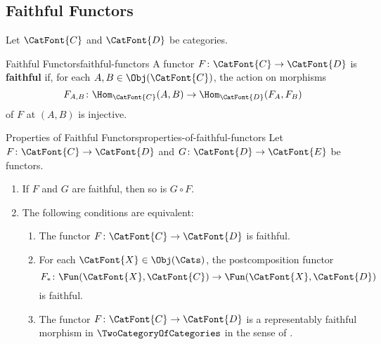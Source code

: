 \subsection{Faithful Functors}\label{subsection-faithful-functors}
Let $\CatFont{C}$ and $\CatFont{D}$ be categories.
\begin{definition}{Faithful Functors}{faithful-functors}%
    A functor $F\colon\CatFont{C}\to\CatFont{D}$ is \textbf{faithful} if, for each $A,B\in\Obj(\CatFont{C})$, the action on morphisms
    \[
        F_{A,B}
        \colon
        \Hom_{\CatFont{C}}(A,B)
        \to
        \Hom_{\CatFont{D}}(F_{A},F_{B})
    \]%
    of $F$ at $(A,B)$ is injective.
\end{definition}
\begin{proposition}{Properties of Faithful Functors}{properties-of-faithful-functors}%
    Let $F\colon\CatFont{C}\to\CatFont{D}$ and $G\colon\CatFont{D}\to\CatFont{E}$ be functors.
    \begin{enumerate}
        \item\label{properties-of-faithful-functors-interaction-with-composition}If $F$ and $G$ are faithful, then so is $G\circ F$.
        \item\label{properties-of-faithful-functors-interaction-with-postcomposition}The following conditions are equivalent:
            \begin{enumerate}
                \item\label{properties-of-faithful-functors-interaction-with-postcomposition-a}The functor $F\colon\CatFont{C}\to\CatFont{D}$ is faithful.
                \item\label{properties-of-faithful-functors-interaction-with-postcomposition-b}For each $\CatFont{X}\in\Obj(\Cats)$, the postcomposition functor
                    \[
                        F_{*}
                        \colon
                        \Fun(\CatFont{X},\CatFont{C})
                        \to
                        \Fun(\CatFont{X},\CatFont{D})
                    \]%
                    is faithful.
                \item\label{properties-of-faithful-functors-interaction-with-postcomposition-c}The functor $F\colon\CatFont{C}\to\CatFont{D}$ is a representably faithful morphism in $\TwoCategoryOfCategories$ in the sense of .

\end{enumerate}
\end{enumerate}
\end{proposition}
